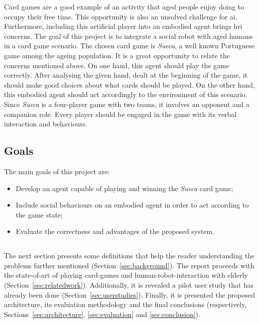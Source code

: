 Card games are a good example of an activity that aged people enjoy doing to occupy their free time.
This opportunity is also an unsolved challenge for \gls{ai}.
Furthermore, including this artificial player into an embodied agent brings \gls{hri} concerns.
The goal of this project is to integrate a social robot with aged humans in a card game scenario.
The chosen card game is \emph{Sueca}, a well known Portuguese game among the ageing population.
It is a great opportunity to relate the concerns mentioned above.
On one hand, this agent should play the game correctly.
After analysing the given hand, dealt at the beginning of the game, it should make good choices about what cards should be played.
On the other hand, this embodied agent should act accordingly to the environment of this scenario.
Since \emph{Sueca} is a four-player game with two teams, it involves an opponent and a companion role.
Every player should be engaged in the game with its verbal interaction and behaviours.


\subsection{Goals}
\label{sec:goals}

The main goals of this project are:
\begin{itemize}
\item Develop an agent capable of playing and winning the \emph{Sueca} card game;
\item Include social behaviours on an embodied agent in order to act according to the game state;
\item Evaluate the correctness and advantages of the proposed system.
\end{itemize}

\subsection*{\centering*}

The next section presents some definitions that help the reader understanding the problems further mentioned (Section~\ref{sec:background}).
The report proceeds with the state-of-art of playing card-games and human-robot-interaction with elderly (Section~\ref{sec:relatedwork}).
Additionally, it is revealed a pilot user study that has already been done (Section~\ref{sec:userstudies}).
Finally, it is presented the proposed architecture, its evaluation methodology and the final conclusions (respectively, Sections~\ref{sec:architecture}, \ref{sec:evaluation} and \ref{sec:conclusion}).


